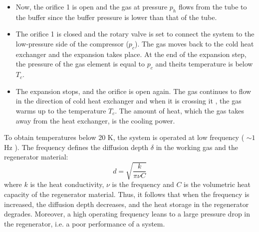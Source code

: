 {\begin{itemize}
\item{Now, the orifice 1 is open and  the gas  at pressure $p_h$ flows from the tube to the buffer since  the buffer pressure is lower than that of the tube.}
\item{ The orifice 1 is closed and the rotary valve is set to connect the system to the low-pressure side of the compressor ($p_c$). The gas moves back to the cold heat exchanger and the expansion takes place.  At the end of the expansion step, the pressure of the gas element is equal to $p_c$  and theits temperature is below $T_c$.}
\item{The expansion stops, and the orifice is open again. The gas continues to flow in the direction of  cold heat exchanger and when it is crossing it , the gas warms up to the temperature $T_c$. The amount of heat, which the gas takes away from the heat exchanger, is the cooling power.}
\end{itemize}
To obtain temperatures below 20 K, the system is  operated at low frequency ( $\sim 1$ Hz ).
The frequency defines the diffusion depth $\delta$ in the working gas and the regenerator material:
$$d = \sqrt{\frac {k}{\pi \nu C}}$$
\noindent where $k$ is the heat conductivity, $\nu$ is the frequency and $C$ is the volumetric heat capacity of the regenerator material. Thus, it follows that when the frequency is increased, the diffusion depth decreases, and the heat storage in the regenerator degrades.
Moreover, a high operating frequency leans to a large pressure drop in the regenerator, i.e. a poor performance of a system.}
\FloatBarrier